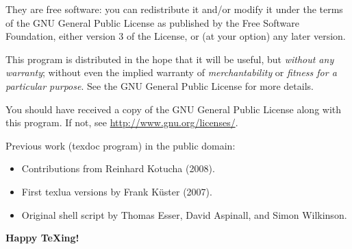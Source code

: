 \documentclass[a4paper, oneside]{scrartcl}
\newcommand\tex{\TeX\xspace}
\begin{document}
They are free software: you can redistribute it and/or modify it under the
terms of the GNU General Public License as published by the Free Software
Foundation, either version 3 of the License, or (at your option) any later
version.

This program is distributed in the hope that it will be useful, but
\emph{without any warranty}; without even the implied warranty of
\emph{merchantability} or \emph{fitness for a particular purpose}.  See the
GNU General Public License for more details.

You should have received a copy of the GNU General Public License along with
this program.  If not, see \url{http://www.gnu.org/licenses/}.

\bigskip

Previous work (texdoc program) in the public domain:
\begin{itemize}
  \item Contributions from Reinhard Kotucha (2008).
  \item First texlua versions by Frank Küster (2007).
  \item Original shell script by Thomas Esser, David Aspinall, and Simon
	Wilkinson.
\end{itemize}

\bigskip
\begin{center}\Large\rmfamily\bfseries
  Happy \tex{}ing!
\end{center}
\end{document}
